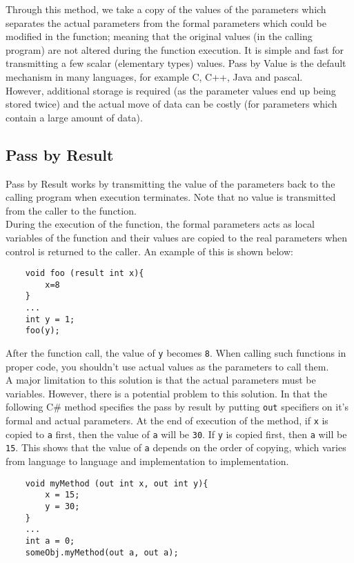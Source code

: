 Through this method, we take a copy of the values of the parameters which separates the actual parameters from the formal parameters which could be modified in the function; meaning that the original values (in the calling program) are not altered during the function execution. It is simple and fast for transmitting a few scalar (elementary types) values. Pass by Value is the default mechanism in many languages, for example C, C++, Java and pascal.\\

However, additional storage is required (as the parameter values end up being stored twice) and the actual move of data can be costly (for parameters which contain a large amount of data). 

\subsection{Pass by Result}
Pass by Result works by transmitting the value of the parameters back to the calling program when execution terminates. Note that no value is transmitted from the caller to the function.\\

During the execution of the function, the formal parameters acts as local variables of the function and their values are copied to the real parameters when control is returned to the caller. An example of this is shown below:
\begin{verbatim}
    void foo (result int x){
        x=8
    }
    ...
    int y = 1;
    foo(y);
\end{verbatim}
After the function call, the value of \verb|y| becomes \verb|8|. When calling such functions in proper code, you shouldn't use actual values as the parameters to call them.\\

A major limitation to this solution is that the actual parameters must be variables. However, there is a potential problem to this solution. In that the following C\# method specifies the pass by result by putting \verb|out| specifiers on it's formal and actual parameters. At the end of execution of the method, if \verb|x| is copied to \verb|a| first, then the value of \verb|a| will be \verb|30|. If \verb|y| is copied first, then \verb|a| will be \verb|15|. This shows that the value of \verb|a| depends on the order of copying, which varies from language to language and implementation to implementation. 

\begin{verbatim}
    void myMethod (out int x, out int y){
        x = 15;
        y = 30;
    }
    ...
    int a = 0;
    someObj.myMethod(out a, out a);
\end{verbatim}

